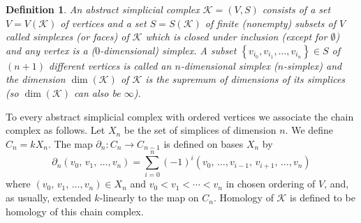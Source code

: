 \documentclass[12pt]{amsart}
\newtheorem{definition}[theorem]{Definition}
\begin{document}
\begin{definition}\label{ASC}
An abstract simplicial complex $\mathcal{K}=(V,S)$ consists of a set $V=V(\mathcal{K})$ of vertices and a set $S = S(\mathcal{K})$ of finite (nonempty) subsets of $V$
called simplexes (or faces) of $\mathcal{K}$ which is closed under inclusion (except for $\emptyset $) and any vertex is a ($0$-dimensional) simplex. A subset $\left\{ v_{i_{0}},v_{i_{1}},\ldots ,v_{i_{n}}\right\}\in S$ of $\left(
n+1\right) $ different vertices is called an $n$-dimensional simplex ($n$-simplex) and the dimension $\dim (\mathcal{K})$ of $\mathcal{K}$ is the supremum of dimensions of its simplices (so $\dim (\mathcal{K})$ can also be $\infty $).
\end{definition}
To every abstract simplicial complex with ordered vertices we associate the chain complex as follows. Let $X_n$ be the set of simplices of dimension $n$. We define $C_n=kX_n$. The map $\partial_n: C_n \to C_{n-1}$ is defined on bases $X_n$ by 
\begin{equation*}
\partial_{n}(v_{0},\,v_{1},\,\ldots,v_{n})=\sum_{i=0}^{n}(-1)^{i}(v_{0},\,\ldots
,v_{i-1},\,v_{i+1},\,\ldots ,v_{n})
\end{equation*}
where $(v_0,\,v_1,\,\ldots,v_n)\in X_n$ and $v_0 < v_1 < \cdots < v_n$ in chosen ordering of $V$, and, as usually, extended $k$-linearly to the map on $C_{n}$.
Homology of $\mathcal K$ is defined to be homology of this chain complex.
\end{document}
